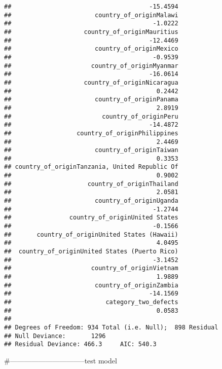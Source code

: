 \documentclass[
]{article}
\begin{document}
\begin{verbatim}
##                                      -15.4594  
##                       country_of_originMalawi  
##                                       -1.0222  
##                    country_of_originMauritius  
##                                      -12.4469  
##                       country_of_originMexico  
##                                       -0.9539  
##                      country_of_originMyanmar  
##                                      -16.0614  
##                    country_of_originNicaragua  
##                                        0.2442  
##                       country_of_originPanama  
##                                        2.8919  
##                         country_of_originPeru  
##                                      -14.4872  
##                  country_of_originPhilippines  
##                                        2.4469  
##                       country_of_originTaiwan  
##                                        0.3353  
## country_of_originTanzania, United Republic Of  
##                                        0.9002  
##                     country_of_originThailand  
##                                        2.0581  
##                       country_of_originUganda  
##                                       -1.2744  
##                country_of_originUnited States  
##                                       -0.1566  
##       country_of_originUnited States (Hawaii)  
##                                        4.0495  
##  country_of_originUnited States (Puerto Rico)  
##                                       -3.1452  
##                      country_of_originVietnam  
##                                        1.9889  
##                       country_of_originZambia  
##                                      -14.1569  
##                          category_two_defects  
##                                        0.0583  
## 
## Degrees of Freedom: 934 Total (i.e. Null);  898 Residual
## Null Deviance:       1296 
## Residual Deviance: 466.3     AIC: 540.3
\end{verbatim}

\#--------------------------------test model
\end{document}
